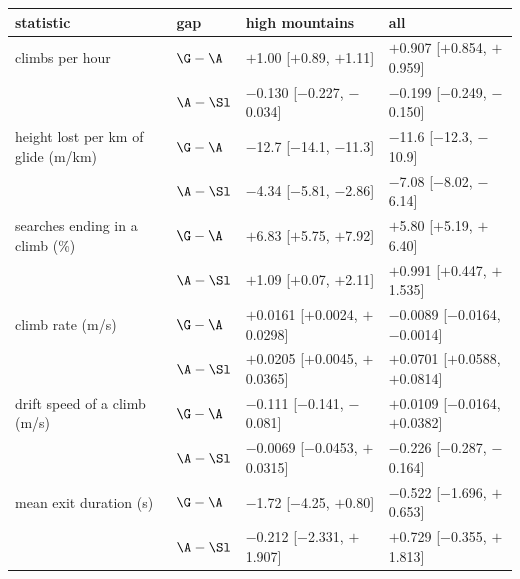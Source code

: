 \begin{tabular}{@{}l l l l @{}}
\toprule
 statistic & gap & high mountains & all  \\
\midrule
climbs per hour & $\G-\A$ & $+$1.00 [$+$0.89, $+$1.11] & $+$0.907 [$+$0.854, $+$0.959]  \\
 & $\A-\Sl$ & $-$0.130 [$-$0.227, $-$0.034] & $-$0.199 [$-$0.249, $-$0.150]  \\
\addlinespace
height lost per km of glide (m/km) & $\G-\A$ & $-$12.7 [$-$14.1, $-$11.3] & $-$11.6 [$-$12.3, $-$10.9]  \\
 & $\A-\Sl$ & $-$4.34 [$-$5.81, $-$2.86] & $-$7.08 [$-$8.02, $-$6.14]  \\
\addlinespace
searches ending in a climb (\%) & $\G-\A$ & $+$6.83 [$+$5.75, $+$7.92] & $+$5.80 [$+$5.19, $+$6.40]  \\
 & $\A-\Sl$ & $+$1.09 [$+$0.07, $+$2.11] & $+$0.991 [$+$0.447, $+$1.535]  \\
\addlinespace
climb rate (m/s) & $\G-\A$ & $+$0.0161 [$+$0.0024, $+$0.0298] & $-$0.0089 [$-$0.0164, $-$0.0014]  \\
 & $\A-\Sl$ & $+$0.0205 [$+$0.0045, $+$0.0365] & $+$0.0701 [$+$0.0588, $+$0.0814]  \\
\addlinespace
drift speed of a climb (m/s) & $\G-\A$ & $-$0.111 [$-$0.141, $-$0.081] & $+$0.0109 [$-$0.0164, $+$0.0382]  \\
 & $\A-\Sl$ & $-$0.0069 [$-$0.0453, $+$0.0315] & $-$0.226 [$-$0.287, $-$0.164]  \\
\addlinespace
mean exit duration (s) & $\G-\A$ & $-$1.72 [$-$4.25, $+$0.80] & $-$0.522 [$-$1.696, $+$0.653]  \\
 & $\A-\Sl$ & $-$0.212 [$-$2.331, $+$1.907] & $+$0.729 [$-$0.355, $+$1.813]  \\
\bottomrule
\end{tabular}
